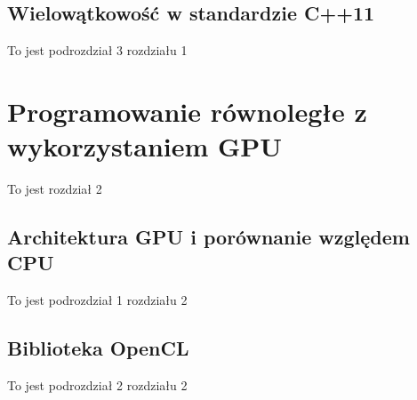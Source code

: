 \documentclass[document.tex]{subfiles}
\begin{document}
	\subsection{Wielowątkowość w standardzie C++11}
	To jest podrozdział 3 rozdziału 1
\section{Programowanie równoległe z wykorzystaniem GPU}
	To jest rozdział 2
	\subsection{Architektura GPU i porównanie względem CPU}
	To jest podrozdział 1 rozdziału 2
	\subsection{Biblioteka OpenCL}
	To jest podrozdział 2 rozdziału 2
\end{document}
